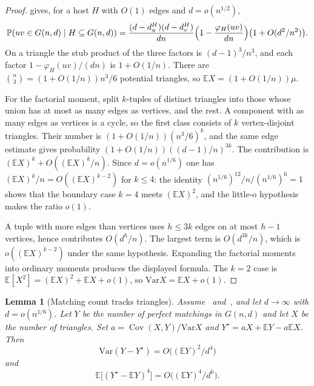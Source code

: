 \documentclass[11pt]{article}
\newtheorem{lemma}[theorem]{Lemma}
\newcommand{\Gnd}{G(n,d)}
\newcommand{\EE}{\mathbb{E}}
\newcommand{\PP}{\mathbb{P}}
\newcommand{\Var}{\mathrm{Var}}
\begin{document}
\begin{proof}
\cite[Theorem~2]{Gao20} gives, for a host \(H\) with \(O(1)\) edges and \(d=o(n^{1/2})\),
\[
\PP(uv\in\Gnd\mid H\subseteq\Gnd)
=
\frac{(d-d_u^H)(d-d_v^H)}{dn}
\Bigl(1-\frac{\varphi_H(uv)}{dn}\Bigr)
\bigl(1+O(d^2/n^2)\bigr).
\]
On a triangle the stub product of the three factors is \((d-1)^3/n^3\), and each
factor \(1-\varphi_H(uv)/(dn)\) is \(1+O(1/n)\). There are \(\binom{n}{3}=(1+O(1/n))n^3/6\)
potential triangles, so \(\EE X=(1+O(1/n))\mu\).

For the factorial moment, split \(k\)-tuples of distinct triangles into those whose
union has at most as many edges as vertices, and the rest. A component with as many
edges as vertices is a cycle, so the first class consists of \(k\) vertex-disjoint
triangles. Their number is \((1+O(1/n))(n^3/6)^k\), and the same edge estimate
gives probability \((1+O(1/n))((d-1)/n)^{3k}\). The contribution is
\((\EE X)^k+O((\EE X)^k/n)\). Since \(d=o(n^{1/6})\) one has
\((\EE X)^k/n=O((\EE X)^{k-2})\) for \(k\le 4\): the identity
\((n^{1/6})^{12}/n\big/(n^{1/6})^6=1\) shows that the boundary case \(k=4\) meets
\((\EE X)^2\), and the little-o hypothesis makes the ratio \(o(1)\).

A tuple with more edges than vertices uses \(h\le 3k\) edges on at most \(h-1\)
vertices, hence contributes \(O(d^h/n)\). The largest term is \(O(d^{3k}/n)\),
which is \(o((\EE X)^{k-2})\) under the same hypothesis. Expanding the factorial
moments into ordinary moments produces the displayed formula. The \(k=2\) case is
\(\EE[X^2]=(\EE X)^2+\EE X+o(1)\), so \(\Var X=\EE X+o(1)\).
\end{proof}

\begin{lemma}[Matching count tracks triangles]
\label{lem:proj}
Assume~\cite[Theorem~6]{Gao20} and~\cite[Theorem~10]{Gao21}, and let \(d\to\infty\)
with \(d=o(n^{1/6})\). Let \(Y\) be the number of perfect matchings in \(\Gnd\) and
let \(X\) be the number of triangles. Set \(a=\operatorname{Cov}(X,Y)/\Var X\) and
\(Y^\star=aX+\EE Y-a\EE X\). Then
\[
\Var(Y-Y^\star)=O\bigl((\EE Y)^2/d^4\bigr)
\]
and
\[
\EE\bigl[(Y^\star-\EE Y)^4\bigr]=O\bigl((\EE Y)^4/d^6\bigr).
\]
\end{lemma}
\end{document}
